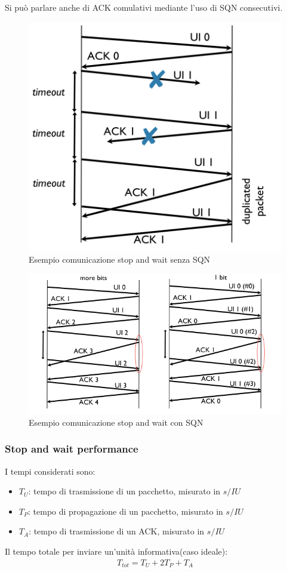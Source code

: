 Si può parlare anche di ACK comulativi mediante l'uso di SQN consecutivi.

\begin{figure}[!ht]
	\centering
	\includegraphics[width=0.3\columnwidth]{./images/esempio_comunicazione_stop_wait_no_sqn.png}
	\caption{Esempio comunicazione stop and wait senza SQN}
	\label{fig:esempio_comunicazione_stop_wait_no_sqn}
\end{figure}


\begin{figure}[!ht]
	\centering
	\includegraphics[width=0.3\columnwidth]{./images/esempio_comunicazione_stop_wait_sqn.png}
	\caption{Esempio comunicazione stop and wait con SQN}
	\label{fig:esempio_comunicazione_stop_wait_sqn}
\end{figure}



\subsubsection{Stop and wait performance}

I tempi considerati sono:
\begin{itemize}
	\item \textbf{$T_U$}: tempo di trasmissione di un pacchetto, misurato in $s/IU$
	\item \textbf{$T_P$}: tempo di propagazione di un pacchetto, misurato in $s/IU$
	\item \textbf{$T_{A}$}: tempo di trasmissione di un ACK, misurato in $s/IU$
\end{itemize}

Il tempo totale per inviare un'unità informativa(caso ideale):
\begin{align}
	T_{tot} = T_{U} + 2T_{P} + T_{A}
\end{align}

